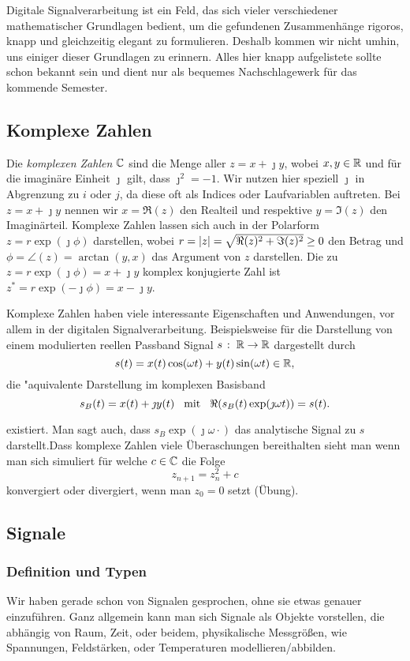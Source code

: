 %
Digitale Signalverarbeitung ist ein Feld, das sich vieler verschiedener mathematischer Grundlagen bedient, um die gefundenen Zusammenh\"ange rigoros, knapp und gleichzeitig elegant zu formulieren.
Deshalb kommen wir nicht umhin, uns einiger dieser Grundlagen zu erinnern. 
Alles hier knapp aufgelistete sollte schon bekannt sein und dient nur als bequemes Nachschlagewerk f\"ur das kommende Semester.
%
\subsection{Komplexe Zahlen}
%
Die \emph{komplexen Zahlen} $\mathbb{C}$ sind die Menge aller $z = x + \jmath y$, wobei $x,y \in \mathbb{R}$ und f\"ur die imagin\"are Einheit $\jmath$ gilt, dass $\jmath^2 = -1$.
Wir nutzen hier speziell $\jmath$ in Abgrenzung zu $i$ oder $j$, da diese oft als Indices oder Laufvariablen auftreten.
Bei $z = x + \jmath y$ nennen wir $x =\Re(z)$ den Realteil und respektive $y = \Im(z)$ den Imagin\"arteil.
Komplexe Zahlen lassen sich auch in der Polarform $z = r \exp(\jmath \phi)$ darstellen, wobei $r = {\left| z \right|} = \sqrt{\Re(z)^2 + \Im(z)^2} \geq 0$ den Betrag und $\phi = \angle(z) = \arctan(y,x)$ das Argument von $z$ darstellen.
Die zu $z = r \exp(\jmath \phi) = x + \jmath y$ komplex konjugierte Zahl ist $z^\ast = r \exp(-\jmath \phi) = x - \jmath y$.

Komplexe Zahlen haben viele interessante Eigenschaften und Anwendungen, vor allem in der digitalen Signalverarbeitung.
Beispielsweise f\"ur die Darstellung von einem modulierten reellen Passband Signal $s \hspace{0.5mm}:\hspace{1.0mm} \mathbb{R} \rightarrow \mathbb{R}$ dargestellt durch
\[
s(t) = x(t)\cos(\omega t) + y(t)\sin(\omega t) \in \mathbb{R},
\]
die "aquivalente Darstellung im komplexen Basisband
\begin{equation}\label{complex_baseband}
    s_B(t) = x(t) + \jmath y(t) {\hspace{3mm} \text{mit} \hspace{3mm}} \Re(s_B(t)\exp(\jmath \omega t)) = s(t).
\end{equation}

existiert. Man sagt auch, dass $s_B \exp(\jmath \omega \cdot)$ das analytische Signal zu $s$ darstellt.Dass komplexe Zahlen viele \"Uberaschungen bereithalten sieht man wenn man sich simuliert f\"ur welche $c \in \mathbb{C}$ die Folge
\[
z_{n+1} = z_{n}^2 + c
\]
konvergiert oder divergiert, wenn man $z_0 = 0$ setzt (\"Ubung). 
%
%
\subsection{Signale}
%
\subsubsection{Definition und Typen}
%
Wir haben gerade schon von Signalen gesprochen, ohne sie etwas genauer einzuf\"uhren. 
Ganz allgemein kann man sich Signale als Objekte vorstellen, die abh\"angig von Raum, Zeit, oder beidem, physikalische Messgr\"o\ss{}en, wie Spannungen, Feldst\"arken, oder Temperaturen modellieren/abbilden.

